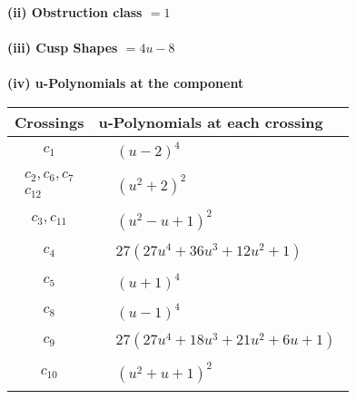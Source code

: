 \documentclass[1p]{elsarticle_modified}
\theoremstyle{definition}
\begin{document}
\flushleft \textbf{(ii) Obstruction class $= 1$}\\~\\
\flushleft \textbf{(iii) Cusp Shapes $= 4 u-8$}\\~\\
\newpage\renewcommand{\arraystretch}{1}
\flushleft \textbf{(iv) u-Polynomials at the component}\newline \\
\begin{tabular}{m{50pt}|m{274pt}}
Crossings & \hspace{64pt}u-Polynomials at each crossing \\
\hline $$\begin{aligned}c_{1}\end{aligned}$$&$\begin{aligned}
&(u-2)^4
\end{aligned}$\\
\hline $$\begin{aligned}c_{2},c_{6},c_{7}\\c_{12}\end{aligned}$$&$\begin{aligned}
&(u^2+2)^2
\end{aligned}$\\
\hline $$\begin{aligned}c_{3},c_{11}\end{aligned}$$&$\begin{aligned}
&(u^2- u+1)^2
\end{aligned}$\\
\hline $$\begin{aligned}c_{4}\end{aligned}$$&$\begin{aligned}
&27(27 u^4+36 u^3+12 u^2+1)
\end{aligned}$\\
\hline $$\begin{aligned}c_{5}\end{aligned}$$&$\begin{aligned}
&(u+1)^4
\end{aligned}$\\
\hline $$\begin{aligned}c_{8}\end{aligned}$$&$\begin{aligned}
&(u-1)^4
\end{aligned}$\\
\hline $$\begin{aligned}c_{9}\end{aligned}$$&$\begin{aligned}
&27(27 u^4+18 u^3+21 u^2+6 u+1)
\end{aligned}$\\
\hline $$\begin{aligned}c_{10}\end{aligned}$$&$\begin{aligned}
&(u^2+u+1)^2
\end{aligned}$\\
\hline
\end{tabular}\\~\\
\end{document}
